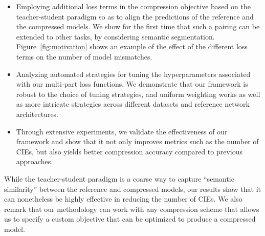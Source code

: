 \begin{itemize}
    \item Employing additional loss terms in the compression objective based on the teacher-student paradigm so as to align the predictions of the reference and the compressed models. %
    We show for the first time that such a pairing can be extended to other tasks, by considering semantic segmentation. Figure~\ref{fig:motivation} shows an example of the effect of the different loss terms on the number of model mismatches.
    \item Analyzing automated strategies for tuning the hyperparameters associated with our multi-part loss functions. We demonstrate that our framework is robust to the choice of tuning strategies, and uniform weighting works as well as more intricate strategies across different datasets and reference network architectures.
    \item Through extensive experiments, we validate the effectiveness of our framework and show that it not only improves metrics such as the number of CIEs, but also yields better compression accuracy compared to previous approaches. %
\end{itemize}


While the teacher-student paradigm is a coarse way to capture ``semantic similarity'' between the reference and compressed models, our results show that it can nonetheless be highly effective in reducing the number of CIEs.
We also remark that our methodology can work with any compression scheme that allows us to specify a custom objective that can be optimized to produce a compressed model. 